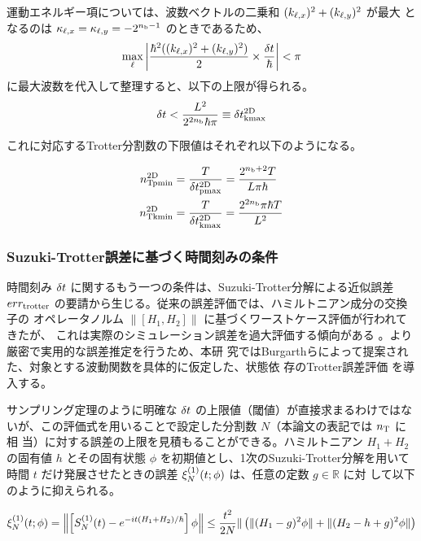 \documentclass[wabun2025.tex]{subfiles}
\begin{document}
運動エネルギー項については、波数ベクトルの二乗和 $(k_{\ell,x})^2+(k_{\ell,y})^2$ が最大
となるのは $\kappa_{\ell,x}=\kappa_{\ell,y}=-2^{n_{\mathrm{b}}-1}$ のときであるため、
\begin{equation}
\max_{\ell}{\left| \frac{\hbar^2((k_{\ell,x})^2+(k_{\ell,y})^2)}{2}\times\frac{\delta t}{\hbar} \right|} < \pi
\end{equation}
に最大波数を代入して整理すると、以下の上限が得られる。
\begin{equation}
\delta t < \frac{L^2}{2^{2n_{\mathrm{b}}}\hbar\pi} \equiv\delta t_{\mathrm{kmax}}^{\mathrm{2D}}
 \label{eq:nyqist-limit-by-hek-final-2D}
\end{equation}

これに対応するTrotter分割数の下限値はそれぞれ以下のようになる。

\begin{align}
    n_{\mathrm{Tpmin}}^{\mathrm{2D}} &= \frac{T}{\delta t_{\mathrm{pmax}}^{\mathrm{2D}}}=\frac{2^{n_{\mathrm{b}}+2}T}{L\pi\hbar} \\
    n_{\mathrm{Tkmin}}^{\mathrm{2D}} &= \frac{T}{\delta t_{\mathrm{kmax}}^{\mathrm{2D}}}=\frac{2^{2n_{\mathrm{b}}}\pi\hbar T}{L^2}
\end{align}

\subsubsection{Suzuki-Trotter誤差に基づく時間刻みの条件}
\label{subsec:deltat-selection-by-trotter-error}

時間刻み $\delta t$ に関するもう一つの条件は、Suzuki-Trotter分解による近似誤差
$err_{\mathrm{trotter}}$ の要請から生じる。従来の誤差評価では、ハミルトニアン成分の交換子の
オペレータノルム $\| [H_1,H_2] \|$ に基づくワーストケース評価が行われてきたが、
これは実際のシミュレーション誤差を過大評価する傾向がある
\cite{Childs2021.PhysRevX.11.011020}。より厳密で実用的な誤差推定を行うため、本研
究ではBurgarthらによって提案された、対象とする波動関数を具体的に仮定した、状態依
存のTrotter誤差評価 \cite{Burgarth2024.PhysRevResearch.6.043155}を導入する。

サンプリング定理のように明確な $\delta t$ の上限値（閾値）が直接求まるわけではな
いが、この評価式を用いることで設定した分割数 $N$（本論文の表記では $n_{\mathrm{T}}$ に相
当）に対する誤差の上限を見積もることができる。ハミルトニアン $H_1+H_2$ の固有値
$h$ とその固有状態 $\phi$ を初期値とし、1次のSuzuki-Trotter分解を用いて時間 $t$
だけ発展させたときの誤差 $\xi_{N}^{(1)}(t;\phi)$ は、任意の定数 $g\in\mathbb{R}$ に対
して以下のように抑えられる\cite{Burgarth2024.PhysRevResearch.6.043155}。

\begin{equation}
    \xi_{N}^{(1)}(t;\phi)=\left\|\left[S_{N}^{(1)}(t)-e^{-it(H_1+H_2)/\hbar}\right]\phi\right\|
    \leq\frac{t^2}{2N}\| \left(\|(H_1-g)^2\phi\|+\|(H_2-h+g)^2\phi\|\right)
    \label{eq:observed-trotter-error-1st}
\end{equation}
\end{document}
